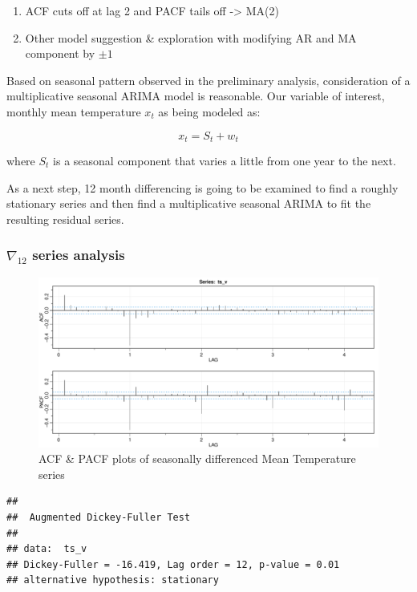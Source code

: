 \documentclass[
  11pt,
]{article}
\providecommand{\tightlist}{%
  \setlength{\itemsep}{0pt}\setlength{\parskip}{0pt}}
\begin{document}
\begin{enumerate}
\def\labelenumi{\arabic{enumi}.}
\tightlist
\item
  ACF cuts off at lag 2 and PACF tails off -\textgreater{} MA(2)
\item
  Other model suggestion \& exploration with modifying AR and MA
  component by \(\pm1\)
\end{enumerate}

Based on seasonal pattern observed in the preliminary analysis,
consideration of a multiplicative seasonal ARIMA model is reasonable.
Our variable of interest, monthly mean temperature \(x_t\) as being
modeled as:

\[x_t = S_t + w_t\]

where \(S_t\) is a seasonal component that varies a little from one year
to the next.

As a next step, 12 month differencing is going to be examined to find a
roughly stationary series and then find a multiplicative seasonal ARIMA
to fit the resulting residual series.

\newpage

\hypertarget{nabla_12-series-analysis-2}{%
\subsubsection{\texorpdfstring{\(\nabla_{12}\) series
analysis}{\textbackslash nabla\_\{12\} series analysis}}\label{nabla_12-series-analysis-2}}

\begin{figure}
\centering
\includegraphics{ST422_files/figure-latex/unnamed-chunk-34-1.pdf}
\caption{ACF \& PACF plots of seasonally differenced Mean Temperature
series}
\end{figure}

\begin{verbatim}
## 
##  Augmented Dickey-Fuller Test
## 
## data:  ts_v
## Dickey-Fuller = -16.419, Lag order = 12, p-value = 0.01
## alternative hypothesis: stationary
\end{verbatim}
\end{document}
